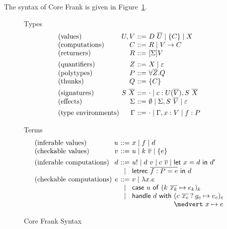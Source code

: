\documentclass[preprint]{sigplanconf}
\makeatletter
\newcommand{\many}{\overline}
\newcommand\ba{\begin{array}}
\newcommand\ea{\end{array}}
\newcommand{\bstack}{\begin{array}[t]{@{}l@{}}}
\newcommand{\estack}{\end{array}}
\newenvironment{syntax}{\[\ba{@{}l@{~}r@{~}c@{~}l@{}}}{\ea\]}
\newcommand{\sig}{S}
\newcommand{\sigs}{\Sigma}
\newcommand{\effbox}[1]{[#1]}
\newcommand{\key}[1]{\mathsf{#1}}
\newcommand{\handleSymbol}{\mathbin{?}}
\newcommand{\handle}[2]{{#1} \handleSymbol {#2}}
\newcommand{\thunk}[1]{\{{#1}\}}
\newcommand{\force}[1]{{#1}!}
\newcommand\slab[1]{(\textrm{#1})}
\makeatother
\begin{document}
The syntax of Core Frank is given in Figure~\ref{fig:core-syntax}.
%
\begin{figure}
Types
\begin{syntax}
\slab{values}       &U, V          &::=& D~\many{U} \mid \thunk{C} \mid X \\
\slab{computations} &C             &::=& R \mid V \to C \\
\slab{returners}    &R             &::=& \effbox{\sigs}V
\\[1ex]
\slab{quantifiers}  &Z             &::=& X \mid \varepsilon \\
\slab{polytypes}    &P             &::=& \forall \many{Z}.Q \\
\slab{thunks}       &Q             &::=& \thunk{C}
\\[1ex]
\slab{signatures}   &\sig~\many{X} &::=& \cdot \mid c : U(\many{V}), \sig~\many{X} \\
\slab{effects}      &\sigs         &::=&
  \emptyset \mid \sigs, \sig~\many{V} \mid \varepsilon
\\[1ex]
\slab{type environments}
                    &\Gamma        &::=& \cdot \mid \Gamma, x:V \mid f:P \\
\end{syntax}

Terms
\begin{syntax}
\slab{inferable values}&u       &::=& x \mid f \mid d                                \\
\slab{checkable values}&v       &::=& u \mid k~\many{v} \mid \thunk{e}
\\[1ex]
\slab{inferable computations}&d &::=& \force{u} \mid d~v \mid c~\many{v}
                               \mid  \key{let}~x=d~\key{in}~d' \\
                             &&\mid& \key{letrec}~\many{f : P = e}~\key{in}~d \\
\slab{checkable computations} &e  &::= & v \mid \lambda x.e \\
   &&\mid& \key{case}~u~\key{of}~
             (k~\many{x_k} \mapsto e_k)_k \\
   &&\mid& \key{handle}~d~\key{with}~
             \bstack
             (\handle{c~\many{x_c}}{g_c} \mapsto e_c)_c \\
             \medvert~ x        \mapsto e \\
             \estack \\
\end{syntax}
\caption{Core Frank Syntax}
\label{fig:core-syntax}
\end{figure}
\end{document}

